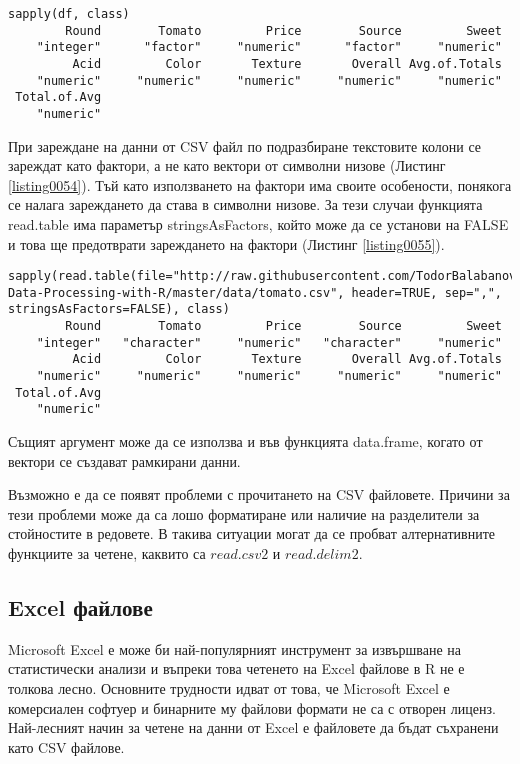 \begin{lstlisting}[caption=Проверка на типовете\, които колоните имат, label=listing0054]
sapply(df, class)
        Round        Tomato         Price        Source         Sweet 
    "integer"      "factor"     "numeric"      "factor"     "numeric" 
         Acid         Color       Texture       Overall Avg.of.Totals 
    "numeric"     "numeric"     "numeric"     "numeric"     "numeric" 
 Total.of.Avg 
    "numeric" 
\end{lstlisting}

При зареждане на данни от CSV файл по подразбиране текстовите колони се зареждат като фактори, а не като вектори от символни низове (Листинг \ref{listing0054}). Тъй като използването на фактори има своите особености, понякога се налага зареждането да става в символни низове. За тези случаи функцията read.table има параметър stringsAsFactors, който може да се установи на FALSE и това ще предотврати зареждането на фактори (Листинг \ref{listing0055}).

\begin{lstlisting}[caption=Зареждане на символни низове, label=listing0055]
sapply(read.table(file="http://raw.githubusercontent.com/TodorBalabanov/Statistical-Data-Processing-with-R/master/data/tomato.csv", header=TRUE, sep=",", stringsAsFactors=FALSE), class)
        Round        Tomato         Price        Source         Sweet 
    "integer"   "character"     "numeric"   "character"     "numeric" 
         Acid         Color       Texture       Overall Avg.of.Totals 
    "numeric"     "numeric"     "numeric"     "numeric"     "numeric" 
 Total.of.Avg 
    "numeric"
\end{lstlisting}

Същият аргумент може да се използва и във функцията data.frame, когато от вектори се създават рамкирани данни.

Възможно е да се появят проблеми с прочитането на CSV файловете. Причини за тези проблеми може да са лошо форматиране или наличие на разделители за стойностите в редовете. В такива ситуации могат да се пробват алтернативните функциите за четене, каквито са $read.csv2$ и $read.delim2$.

\subsection{Excel файлове}

Microsoft Excel е може би най-популярният инструмент за извършване на статистически анализи и въпреки това четенето на Excel файлове в R не е толкова лесно. Основните трудности идват от това, че Microsoft Excel е комерсиален софтуер и бинарните му файлови формати не са с отворен лиценз. Най-лесният начин за четене на данни от Excel е файловете да бъдат съхранени като CSV файлове.


